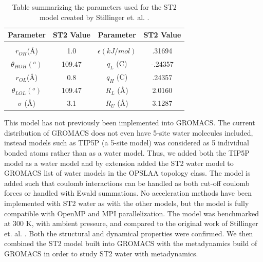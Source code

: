 \begin{table}
	\centering
	\caption[Table summarizing the parameters used for the ST2 model created by Stillinger et. al.]{Table summarizing the parameters used for the ST2 model created by Stillinger et. al. \cite{Stillinger1974}.}
	\label{ST2_parameters}
	\begin{tabular}{ c c c c }
		Parameter& ST2 Value & Parameter & ST2 Value \\
		\hline	
		\hline		
		\\
		$r_{OH} $(\AA)      & 1.0    & $\epsilon (kJ/mol)$ & .31694 \\
		$\theta_{HOH} (^o)$ & 109.47 & $q_L$ (C)           & -.24357 \\
		$r_{OL} $(\AA)      & 0.8    & $q_H$ (C)           & .24357 \\
		$\theta_{LOL} (^o)$ & 109.47 & $R_L$ (\AA)         & 2.0160 \\
		$\sigma$ (\AA)      & 3.1    & $R_U$ (\AA)         & 3.1287\\
		\hline 
	\end{tabular}
\end{table}

This model has not previously been implemented into GROMACS.  The current distribution of GROMACS does not even have 5-site water molecules included, instead models such as TIP5P (a 5-site model) was considered as 5 individual bonded atoms rather than as a water model.  Thus, we added both the TIP5P model as a water model and by extension added the ST2 water model to GROMACS list of water models in the OPSLAA topology class.  The model is added such that coulomb interactions can be handled as both cut-off coulomb forces or handled with Ewald summations.  No acceleration methods have been implemented with ST2 water as with the other models, but the model is fully compatible with OpenMP and MPI parallelization.  The model was benchmarked at 300 K, with ambient pressure, and compared to the original work of Stillinger et. al. \cite{Stillinger1974}.  Both the structural and dynamical properties were confirmed.  We then combined the ST2 model built into GROMACS with the metadynamics build of GROMACS in order to study ST2 water with metadynamics.

